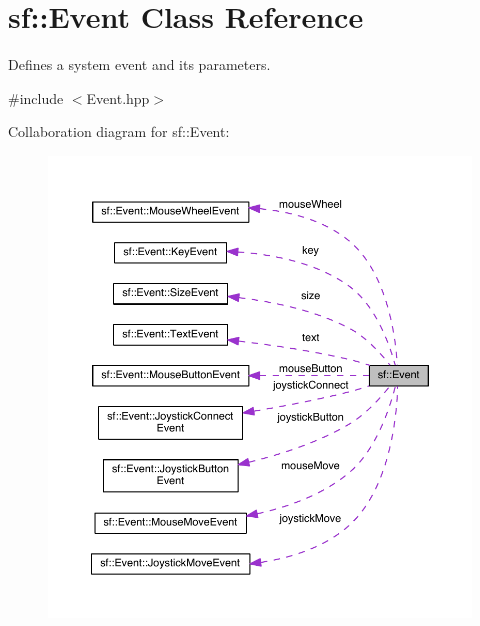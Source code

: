 \hypertarget{classsf_1_1_event}{\section{sf\-:\-:Event Class Reference}
\label{classsf_1_1_event}
}


Defines a system event and its parameters.  




{\ttfamily \#include $<$Event.\-hpp$>$}



Collaboration diagram for sf\-:\-:Event\-:
\nopagebreak
\begin{figure}[H]
\begin{center}
\leavevmode
\includegraphics[width=350pt]{classsf_1_1_event__coll__graph}
\end{center}
\end{figure}
